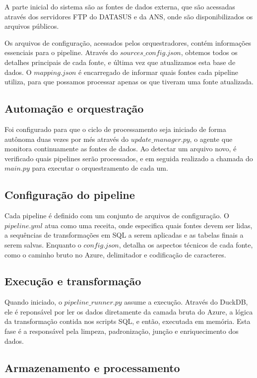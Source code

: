 A parte inicial do sistema são as fontes de dados externa, que são acessadas através dos servidores FTP do DATASUS e da ANS, onde são disponibilizados os arquivos públicos.

Os arquivos de configuração, acessados pelos orquestradores, contém informações essenciais para o pipeline. Através do $sources\_config.json$, obtemos todos os detalhes principais de cada fonte, e última vez que atualizamos esta base de dados. O $mapping.json$ é encarregado de informar quais fontes cada pipeline utiliza, para que possamos processar apenas os que tiveram uma fonte atualizada.

\subsection{Automação e orquestração}

Foi configurado para que o ciclo de processamento seja iniciado de forma autônoma duas vezes por més através do $update\_manager.py$, o agente que monitora continuamente as fontes de dados. Ao detectar um arquivo novo, é verificado quais pipelines serão processados, e em seguida realizado a chamada do $main.py$ para executar o orquestramento de cada um.

\subsection{Configuração do pipeline}

Cada pipeline é definido com um conjunto de arquivos de configuração. O $pipeline.yml$ atua como uma receita, onde especifica quais fontes devem ser lidas, a sequências de transformações em SQL a serem aplicadas e as tabelas finais a serem salvas.
Enquanto o  $config.json$, detalha os aspectos técnicos de cada fonte, como o caminho bruto no Azure, delimitador e codificação de caracteres.

\subsection{Execução e transformação}

Quando iniciado, o $pipeline\_runner.py$ assume a execução. Através do DuckDB, ele é reponsável por ler os dados diretamente da camada bruta do Azure, a lógica da transformação contida nos scripts SQL, e então, executada em memória. Esta fase é a responsável pela limpeza, padronização, junção e enriquecimento dos dados.

\subsection{Armazenamento e processamento}

